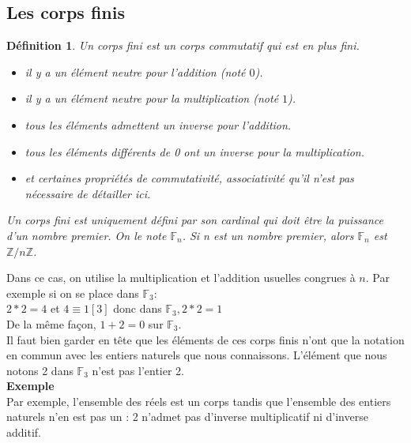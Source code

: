 \documentclass[a4paper]{article}
\newtheorem{Def}{Définition}[section]
\begin{document}
\subsection{Les corps finis}
\begin{Def}
  Un corps fini est un corps commutatif qui est en plus fini.\\
  \begin{itemize}
\item il y a un élément neutre pour l'addition (noté $0$).
\item il y a un élément neutre pour la multiplication (noté $1$).
\item tous les éléments admettent un inverse pour l'addition.
\item tous les éléments différents de 0 ont un inverse pour la multiplication.
\item et certaines propriétés de commutativité, associativité qu'il n'est pas nécessaire de détailler ici.
  \end{itemize}
Un corps fini est uniquement défini par son cardinal qui doit être la puissance d'un nombre premier. On le note $\mathbb{F}_n$.
Si n est un nombre premier, alors $\mathbb{F}_n$ est $\mathbb{Z}/n\mathbb{Z}$.
\end{Def}
  Dans ce cas, on utilise la multiplication et l'addition usuelles congrues à $n$. Par exemple si on se place dans $\mathbb{F}_3$:\\
  $2*2=4$ et $4 \equiv 1 [3]$ donc dans $\mathbb{F}_3,2*2=1$\\
  De la même façon, $1+2=0$ sur $\mathbb{F}_3$\vspace{1\baselineskip}.\\
Il faut bien garder en tête que les éléments de ces corps finis n'ont que la notation en commun avec les entiers naturels que nous connaissons. L'élément que nous notons 2 dans $\mathbb{F}_3$ n'est pas l'entier 2.\vspace{1\baselineskip}\\
\textbf{Exemple}\\
  Par exemple, l'ensemble des réels est un corps tandis que l'ensemble des entiers naturels n'en est pas un : 2 n'admet pas d'inverse multiplicatif ni d'inverse additif.
\end{document}
